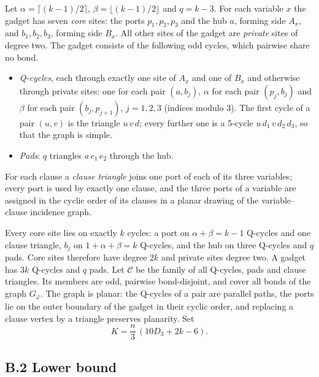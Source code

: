 \documentclass[aps,pre,onecolumn,nofootinbib]{revtex4-2}
\theoremstyle{remark}
\begin{document}
Let $\alpha=\lceil(k-1)/2\rceil$, $\beta=\lfloor(k-1)/2\rfloor$ and $q=k-3$. For each variable $x$
the gadget has seven \emph{core} sites: the ports $p_1,p_2,p_3$ and the hub $a$, forming side
$A_x$, and $b_1,b_2,b_3$, forming side $B_x$. All other sites of the gadget are \emph{private}
sites of degree two. The gadget consists of the following odd cycles, which pairwise share no
bond.
\begin{itemize}
\item \emph{Q-cycles}, each through exactly one site of $A_x$ and one of $B_x$ and otherwise through
private sites: one for each pair $(a,b_j)$, $\alpha$ for each pair $(p_j,b_j)$ and $\beta$ for each
pair $(b_j,p_{j+1})$, $j=1,2,3$ (indices modulo 3). The first cycle of a pair $(u,v)$ is the
triangle $u\,v\,d$; every further one is a 5-cycle $u\,d_1\,v\,d_2\,d_3$, so that the graph is simple.
\item \emph{Pads}: $q$ triangles $a\,e_1\,e_2$ through the hub.
\end{itemize}
For each clause a \emph{clause triangle} joins one port of each of its three variables; every port
is used by exactly one clause, and the three ports of a variable are assigned in the cyclic order
of its clauses in a planar drawing of the variable--clause incidence graph.

Every core site lies on exactly $k$ cycles: a port on $\alpha+\beta=k-1$ Q-cycles and one clause
triangle, $b_j$ on $1+\alpha+\beta=k$ Q-cycles, and the hub on three Q-cycles and $q$ pads. Core
sites therefore have degree $2k$ and private sites degree two. A gadget has $3k$ Q-cycles and $q$
pads. Let $\mathcal C$ be the family of all Q-cycles, pads and clause triangles. Its members are
odd, pairwise bond-disjoint, and cover all bonds of the graph $G_\varphi$. The graph is planar: the
Q-cycles of a pair are parallel paths, the ports lie on the outer boundary of the gadget in their
cyclic order, and replacing a clause vertex by a triangle preserves planarity. Set
\begin{equation}
K=\frac n3\,(10D_3+2k-6).
\end{equation}

\subsection*{B.2 Lower bound}
\end{document}
